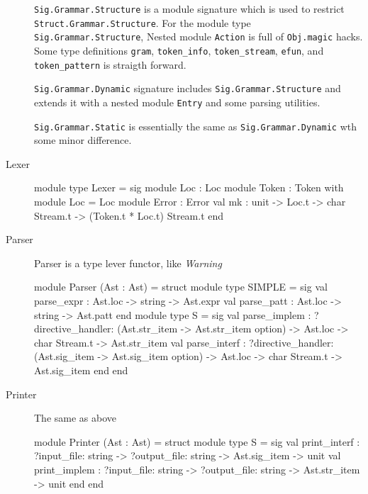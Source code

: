 \begin{description}
\verb|Sig.Grammar.Structure| is a module signature which is used to
restrict \verb|Struct.Grammar.Structure|. For the module type
\verb|Sig.Grammar.Structure|, Nested module \verb|Action| is full of
\verb|Obj.magic| hacks. Some type definitions \verb|gram|,
\verb|token_info|, \verb|token_stream|, \verb|efun|, and
\verb|token_pattern| is straigth forward.

\verb|Sig.Grammar.Dynamic| signature  includes
\verb|Sig.Grammar.Structure| and extends it with a nested module
\verb|Entry| and some parsing utilities.

\verb|Sig.Grammar.Static| is essentially the same as
\verb|Sig.Grammar.Dynamic| wth some minor difference.

\item[Lexer]

\begin{ocamlcode}
  module type Lexer =  sig
    module Loc : Loc
    module Token : Token with module Loc = Loc
    module Error : Error
    val mk : unit -> Loc.t -> char Stream.t -> (Token.t * Loc.t) Stream.t
  end
\end{ocamlcode}
  
  
\item[Parser] Parser is a type lever functor, like \textit{Warning}

\begin{ocamlcode}
module Parser (Ast : Ast) =  struct
    module type SIMPLE =      sig
        val parse_expr : Ast.loc -> string -> Ast.expr
        val parse_patt : Ast.loc -> string -> Ast.patt
      end
    module type S =      sig
        val parse_implem :
          ?directive_handler: (Ast.str_item -> Ast.str_item option) ->
            Ast.loc -> char Stream.t -> Ast.str_item
        val parse_interf :
          ?directive_handler: (Ast.sig_item -> Ast.sig_item option) ->
            Ast.loc -> char Stream.t -> Ast.sig_item
      end
  end  
\end{ocamlcode}

\item[Printer] The same as above

\begin{ocamlcode}
module Printer (Ast : Ast) =  struct
    module type S =    sig
        val print_interf :
          ?input_file: string -> ?output_file: string -> Ast.sig_item -> unit
        val print_implem :
          ?input_file: string -> ?output_file: string -> Ast.str_item -> unit
      end
  end            
\end{ocamlcode}
  

\end{description}
